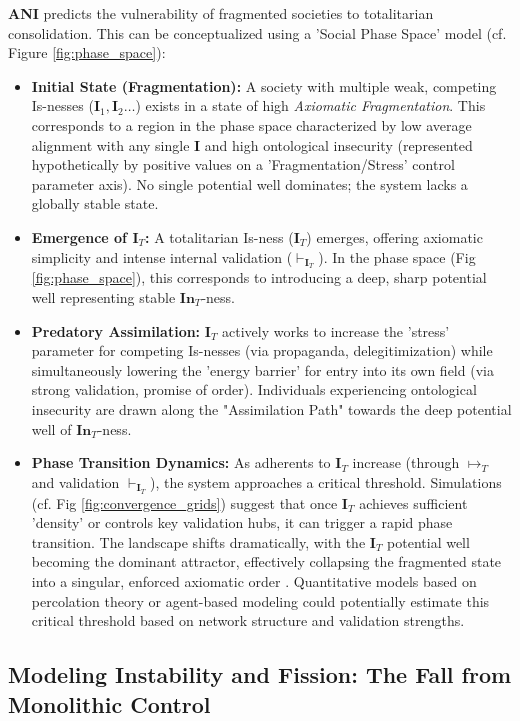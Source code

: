 \documentclass{article}
\newcommand{\ANI}{\textbf{ANI}}             %
\newcommand{\Isness}{\mathbf{I}}            %
\newcommand{\Inness}{\mathbf{In}}           %
\newcommand{\enactment}{\ensuremath{\mapsto}} %
\newcommand{\validates}[1]{\ensuremath{\vdash_{#1}}} %
\begin{document}
\ANI{} predicts the vulnerability of fragmented societies to totalitarian consolidation. This can be conceptualized using a 'Social Phase Space' model (cf. Figure \ref{fig:phase_space}):
\begin{itemize}
    \item \textbf{Initial State (Fragmentation):} A society with multiple weak, competing Is-nesses ($\Isness_1, \Isness_2 \dots$) exists in a state of high \textit{Axiomatic Fragmentation}. This corresponds to a region in the phase space characterized by low average alignment with any single $\Isness$ and high ontological insecurity (represented hypothetically by positive values on a 'Fragmentation/Stress' control parameter axis). No single potential well dominates; the system lacks a globally stable state.
    \item \textbf{Emergence of $\Isness_T$:} A totalitarian Is-ness ($\Isness_T$) emerges, offering axiomatic simplicity and intense internal validation ($\validates{\Isness_T}$). In the phase space (Fig \ref{fig:phase_space}), this corresponds to introducing a deep, sharp potential well representing stable $\Inness_T$-ness.
    \item \textbf{Predatory Assimilation:} $\Isness_T$ actively works to increase the 'stress' parameter for competing Is-nesses (via propaganda, delegitimization) while simultaneously lowering the 'energy barrier' for entry into its own field (via strong validation, promise of order). Individuals experiencing ontological insecurity are drawn along the "Assimilation Path" towards the deep potential well of $\Inness_T$-ness.
    \item \textbf{Phase Transition Dynamics:} As adherents to $\Isness_T$ increase (through $\enactment_T$ and validation $\validates{\Isness_T}$), the system approaches a critical threshold. Simulations (cf. Fig \ref{fig:convergence_grids}) suggest that once $\Isness_T$ achieves sufficient 'density' or controls key validation hubs, it can trigger a rapid phase transition. The landscape shifts dramatically, with the $\Isness_T$ potential well becoming the dominant attractor, effectively collapsing the fragmented state into a singular, enforced axiomatic order \citep{Arendt1951}. Quantitative models based on percolation theory or agent-based modeling could potentially estimate this critical threshold based on network structure and validation strengths.
\end{itemize}

\subsection{Modeling Instability and Fission: The Fall from Monolithic Control}
\end{document}
